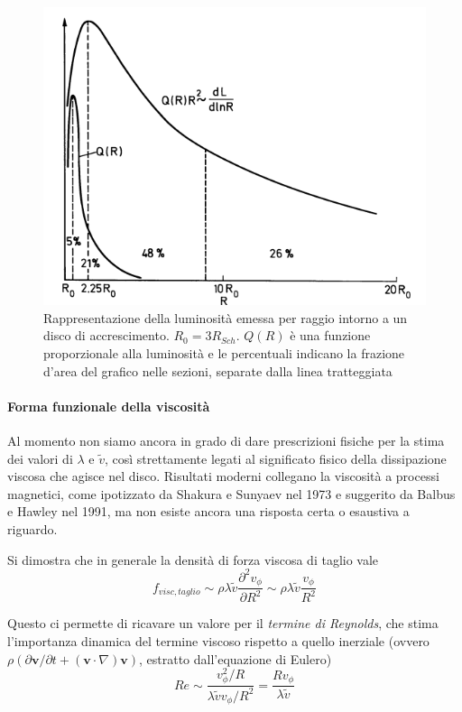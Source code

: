 \documentclass[a4paperbi]{article}
\begin{document}
	\begin{figure}[H]
		\centering
		\includegraphics[width=0.8\linewidth]{LuminositaRaggio}
		\caption{Rappresentazione della luminosità emessa per raggio intorno a un disco di accrescimento. $R_0=3R_{Sch}$. $Q(R)$ è una funzione proporzionale alla luminosità e le percentuali indicano la frazione d'area del grafico nelle sezioni, separate dalla linea tratteggiata}
		\label{fig:LuminositaRaggio}
	\end{figure}

	\paragraph{Forma funzionale della viscosità}	
	Al momento non siamo ancora in grado di dare prescrizioni fisiche per la stima dei valori di $\lambda$ e $\tilde{v}$, così strettamente legati al significato fisico della dissipazione viscosa che agisce nel disco. Risultati moderni collegano la viscosità a processi magnetici, come ipotizzato da Shakura e Sunyaev nel 1973 e suggerito da Balbus e Hawley nel 1991, ma non esiste ancora una risposta certa o esaustiva a riguardo. 
	
	Si dimostra che in generale la densità di forza viscosa di taglio vale
	\begin{equation}
		f_{visc,taglio}\sim\rho\lambda\tilde{v}\frac{\partial^2v_\phi}{\partial R^2}\sim\rho\lambda\tilde{v}\frac{v_\phi}{R^2}
	\end{equation}

	Questo ci permette di ricavare un valore per il \textit{termine di Reynolds}, che stima l'importanza dinamica del termine viscoso rispetto a quello inerziale (ovvero $\rho(\partial\textbf{v}/\partial t+(\textbf{v}\cdot\nabla)\textbf{v})$, estratto dall'equazione di Eulero)
	\begin{equation}
		Re\sim\frac{v_\phi^2/R}{\lambda\tilde{v}v_\phi/R^2}=\frac{Rv_\phi}{\lambda\tilde{v}}
	\end{equation}
	
\end{document}
